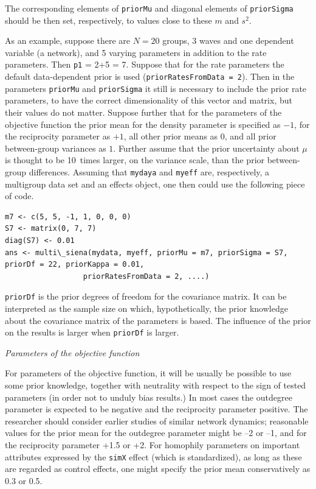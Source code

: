 \documentclass[a4paper,fleqn,11pt]{article}
\newcommand{\+}{\, + \,}
\newcommand{\SI}{{\sf SIENA }}
\begin{document}
The corresponding elements of \texttt{priorMu} and diagonal elements
of \texttt{priorSigma} should be then set, respectively, to values
close to these $m$ and $s^2$.

As an example, suppose there are $N = 20$ groups, 3 waves and one dependent
variable (a network), and 5 varying parameters in addition to the rate parameters.
Then \texttt{p1} = 2+5 = 7.
Suppose that for the rate parameters the default
data-dependent prior is used (\texttt{priorRatesFromData = 2}).
Then in the parameters \texttt{priorMu} and \texttt{priorSigma}
it still is necessary to include the prior rate parameters,
to have the correct dimensionality of this vector and matrix,
but their values do not matter.
Suppose further that for the parameters of the objective function
the prior mean for the density parameter is specified as $-1$,
for the reciprocity parameter as $+1$,
all other prior means as $0$, and all prior between-group variances as $1$.
Further assume that the prior uncertainty about $\mu$ is thought to be
10~times larger, on the variance scale, than the prior between-group differences.
Assuming that \texttt{mydaya}  and \texttt{myeff} are,
respectively, a multigroup data set and an effects object,
one then could use the following piece of code.

{\small
\begin{verbatim}
m7 <- c(5, 5, -1, 1, 0, 0, 0)
S7 <- matrix(0, 7, 7)
diag(S7) <- 0.01
ans <- multi\_siena(mydata, myeff, priorMu = m7, priorSigma = S7, priorDf = 22, priorKappa = 0.01,
                  priorRatesFromData = 2, ....)
\end{verbatim}
}
\noindent
\texttt{priorDf} is the prior degrees of freedom for the
covariance matrix. It can be interpreted as the sample size on which,
hypothetically, the prior knowledge about the covariance matrix of the
parameters is based.
The influence of the prior on the results is larger when \texttt{priorDf}
is larger.
\medskip

\noindent
\emph{Parameters of the objective function}
\smallskip

\noindent
For parameters of the objective function, it will be usually be possible
to use some prior knowledge, together with neutrality with respect to
the sign of tested parameters (in order not to unduly bias results.)
In most cases the outdegree parameter is expected to be negative and
the reciprocity parameter positive. The researcher should consider
earlier studies of similar network dynamics; reasonable values for the
prior mean for the outdegree parameter might be --2 or --1, and for the
reciprocity parameter +1.5 or +2. For homophily parameters on important
attributes expressed by the \texttt{simX} effect (which is standardized),
as long as these are regarded as control effects, one might specify the
prior mean conservatively as 0.3 or 0.5.

\end{document}
